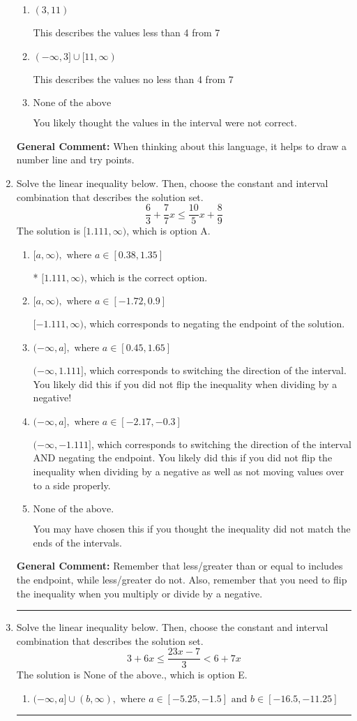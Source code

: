 \documentclass{extbook}[14pt]
\newcommand{\litem}[1]{\item #1

\rule{\textwidth}{0.4pt}}
\begin{document}
\begin{enumerate}
{\begin{enumerate}[label=\Alph*.]
This describes the values no more than 4 from 7
\item \( (3, 11) \)

This describes the values less than 4 from 7
\item \( (-\infty, 3] \cup [11, \infty) \)

This describes the values no less than 4 from 7
\item \( \text{None of the above} \)

You likely thought the values in the interval were not correct.
\end{enumerate}

\textbf{General Comment:} When thinking about this language, it helps to draw a number line and try points.
}
\litem{
Solve the linear inequality below. Then, choose the constant and interval combination that describes the solution set.
\[ \frac{6}{3} + \frac{7}{7} x \leq \frac{10}{5} x + \frac{8}{9} \]The solution is \( [1.111, \infty) \), which is option A.\begin{enumerate}[label=\Alph*.]
\item \( [a, \infty), \text{ where } a \in [0.38, 1.35] \)

* $[1.111, \infty)$, which is the correct option.
\item \( [a, \infty), \text{ where } a \in [-1.72, 0.9] \)

 $[-1.111, \infty)$, which corresponds to negating the endpoint of the solution.
\item \( (-\infty, a], \text{ where } a \in [0.45, 1.65] \)

 $(-\infty, 1.111]$, which corresponds to switching the direction of the interval. You likely did this if you did not flip the inequality when dividing by a negative!
\item \( (-\infty, a], \text{ where } a \in [-2.17, -0.3] \)

 $(-\infty, -1.111]$, which corresponds to switching the direction of the interval AND negating the endpoint. You likely did this if you did not flip the inequality when dividing by a negative as well as not moving values over to a side properly.
\item \( \text{None of the above}. \)

You may have chosen this if you thought the inequality did not match the ends of the intervals.
\end{enumerate}

\textbf{General Comment:} Remember that less/greater than or equal to includes the endpoint, while less/greater do not. Also, remember that you need to flip the inequality when you multiply or divide by a negative.
}
\litem{
Solve the linear inequality below. Then, choose the constant and interval combination that describes the solution set.
\[ 3 + 6 x \leq \frac{23 x - 7}{3} < 6 + 7 x \]The solution is \( \text{None of the above.} \), which is option E.\begin{enumerate}[label=\Alph*.]
\item \( (-\infty, a] \cup (b, \infty), \text{ where } a \in [-5.25, -1.5] \text{ and } b \in [-16.5, -11.25] \)


\end{enumerate}}
\end{enumerate}
\end{document}
